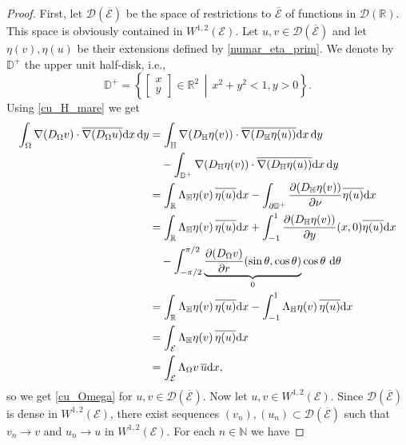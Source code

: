 \documentclass{amsart} %
\numberwithin{equation}{section}
\theoremstyle{definition}
\begin{document}
\begin{proof}
First, let $\mathcal{D}(\overline{\mathcal{E}})$ be the space of restrictions to $\overline{\mathcal{E}}$ of functions in $\mathcal{D}(\mathbb{R})$. This space is obviously contained in $W^{1,2}(\mathcal{E})$. Let
$u,v\in \mathcal{D}(\overline{\mathcal{E}})$ and let $\eta(v),\eta(u)$ be their extensions defined by \eqref{numar_eta_prim}. We denote by $\mathbb{D}^+$ the upper unit half-disk, i.e., 
\begin{equation}
    \mathbb{D}^+ = \left\{ \left.\begin{bmatrix} x \\ y \end{bmatrix} \in \mathbb{R}^2 \ \ \right| \ \ x^2 + y^2 < 1, y > 0 \right\}.
\end{equation}
Using \eqref{cu_H_mare} we get
\begin{equation}
\begin{aligned}
  \int_\Omega\nabla(D_\Omega v)\cdot \overline{\nabla (D_\Omega u)}{\rm d}x\,{\rm d}y&= \int_\mathbb{H}\nabla(D_\mathbb{H}\eta(v))\cdot\overline{\nabla (D_\mathbb{H} \eta(u))}{\rm d}x\,{\rm d}y\\
  &\quad-\int_{\mathbb{D}^+}\nabla(D_\mathbb{H}\eta(v))\cdot\overline{\nabla (D_\mathbb{H} \eta(u))}{\rm d}x\,{\rm d}y\\
  &=\int_{\mathbb{R}}\Lambda_{\mathbb{H}}\eta(v)\,\overline{\eta(u)}{\rm d}x-\int_{\partial\mathbb{D}^+}\frac{\partial (D_\mathbb{H}\eta(v))}{\partial\nu}\overline{\eta(u)}{\rm d}x\\
  &=\int_{\mathbb{R}}\Lambda_{\mathbb{H}}\eta(v)\,\overline{\eta(u)}{\rm d}x+\int_{-1}^1\frac{\partial (D_\mathbb{H}\eta(v))}{\partial y}(x,0)\overline{\eta(u)}{\rm d}x\\
  & \quad -\int_{-\pi/2}^{\pi/2}\underbrace{\frac{\partial (D_{\Omega}v)}{\partial r}(\sin\theta,\cos\theta)}_\text{$0$}\cos\theta{\rm\ d}\theta\\
  &=\int_{\mathbb{R}}\Lambda_{\mathbb{H}}\eta(v)\,\overline{\eta(u)}{\rm d}x-\int_{-1}^1\Lambda_{\mathbb{H}}\eta(v)\,\overline{\eta(u)}{\rm d}x\\
 &=\int_{\mathcal{E}}\Lambda_{\mathbb{H}}\eta(v)\,\overline{\eta(u)}{\rm d}x\\
 &= \int_{\mathcal{E}}\Lambda_\Omega v\,\overline{u}{\rm d}x,
\end{aligned}
\end{equation}
so we get \eqref{cu_Omega} for $u,v\in \mathcal{D}(\overline{\mathcal{E}})$. Now let $u,v\in W^{1,2}(\mathcal{E})$. Since $\mathcal{D}(\overline{\mathcal{E}})$ is dense in $W^{1,2}(\mathcal{E})$, there exist sequences $(v_n),(u_n)\subset \mathcal{D}(\overline{\mathcal{E}})$ such that $v_n\to v$ and $u_n\to u$ in $W^{1,2}(\mathcal{E})$. For each $n\in\mathbb{N}$ we have

\end{proof}
\end{document}
